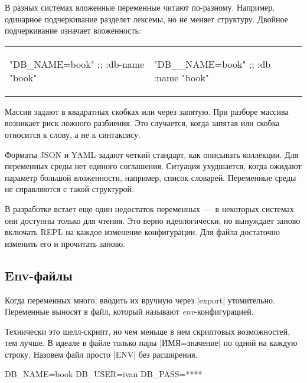 В разных системах вложенные переменные читают по-разному. Например, одинарное
подчеркивание разделет лексемы, но не меняет структуру. Двойное подчеркивание
означает вложенность:

\noindent
\begin{tabular}{ @{}p{5cm} @{}p{5cm} }

\begin{english}
  \begin{clojure}
"DB_NAME=book"
;; {:db-name "book"}
  \end{clojure}
\end{english}

&

\begin{english}
  \begin{clojure}
"DB__NAME=book"
;; {:db {:name "book"}}
  \end{clojure}
\end{english}

\end{tabular}

Массив задают в квадратных скобках или через запятую. При разборе массива
возникает риск ложного разбиения. Это случается, когда запятая или скобка
относится к слову, а не к синтаксису.

Форматы JSON и YAML задают четкий стандарт, как описывать коллекции. Для
переменных среды нет единого соглашения. Ситуация ухудшается, когда ожидают
параметр большой вложенности, например, список словарей. Переменные среды не
справляются с такой структурой.

В разработке встает еще один недостаток переменных~--- в некоторых системах
они доступны только для чтения. Это верно идеологически, но вынуждает заново
включать REPL на каждое изменение конфигурации. Для файла достаточно изменить
его и прочитать заново.

\subsection{Env-файлы}

Когда переменных много, вводить их вручную через \spverb|export|
утомительно. Переменные выносят в файл, который называют
\emph{env}-конфигурацией.

Технически это шелл-скрипт, но чем меньше в нем скриптовых возможностей, тем
лучше. В идеале в файле только пары \spverb|ИМЯ=значение| по одной на каждую
строку. Назовем файл просто \spverb|ENV| без расширения.

\begin{english}
  \begin{bash}
DB_NAME=book
DB_USER=ivan
DB_PASS=****
  \end{bash}
\end{english}

